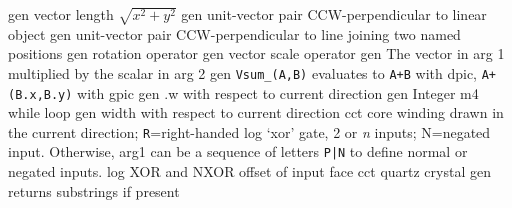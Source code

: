   {gen}
  {vector length $\sqrt{x^2+y^2}$}
  {gen}
  {unit-vector pair CCW-perpendicular to linear object}
  {gen}
  {unit-vector pair CCW-perpendicular to line joining two named positions}
  {gen}
  {rotation operator}
  {gen}
  {vector scale operator}
  {gen}
  {The vector in arg 1 multiplied by the scalar in arg 2}
  {gen}
  {{\tt Vsum\_(A,B)} evaluates to {\tt A+B} with dpic, {\tt A+(B.x,B.y)}
   with gpic}
  {gen}
  {.w with respect to current direction}
  {gen}
  {Integer m4 while loop}
  {gen}
  {width with respect to current direction}
  {cct}
  {core winding drawn in the current direction; {\tt R}=right-handed
   }
  {log}
  {`xor' gate, 2 or {\sl n\/} inputs; N=negated input.
   Otherwise, arg1 can be a sequence of letters {\tt P|N}
   to define normal or negated inputs.
    }
  {log}
  {XOR and NXOR offset of input face}
  {cct}
  {quartz crystal}
  {gen}
  {returns substrings if present}
